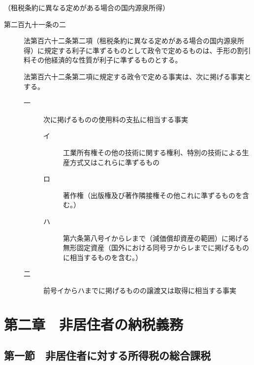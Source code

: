 \documentclass[twocolumn,a4j,10pt]{ltjtarticle}
\begin{document}
\noindent\hspace{10pt}（租税条約に異なる定めがある場合の国内源泉所得）
\begin{description}
\item[第二百九十一条の二]法第百六十二条第二項（租税条約に異なる定めがある場合の国内源泉所得）に規定する利子に準ずるものとして政令で定めるものは、手形の割引料その他経済的な性質が利子に準ずるものとする。
\item[]法第百六十二条第二項に規定する政令で定める事実は、次に掲げる事実とする。
\begin{description}
\item[一]次に掲げるものの使用料の支払に相当する事実
\begin{description}
\item[イ]工業所有権その他の技術に関する権利、特別の技術による生産方式又はこれらに準ずるもの
\item[ロ]著作権（出版権及び著作隣接権その他これに準ずるものを含む。）
\item[ハ]第六条第八号イからレまで（減価償却資産の範囲）に掲げる無形固定資産（国外における同号ヲからレまでに掲げるものに相当するものを含む。）
\end{description}
\item[二]前号イからハまでに掲げるものの譲渡又は取得に相当する事実
\end{description}
\end{description}
\section*{第二章　非居住者の納税義務}
\subsection*{第一節　非居住者に対する所得税の総合課税}
\end{document}
